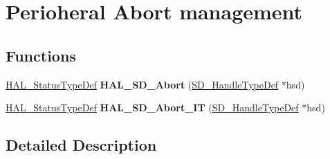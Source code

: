 \hypertarget{group___s_d___exported___functions___group6}{}\section{Perioheral Abort management}
\label{group___s_d___exported___functions___group6}
\subsection*{Functions}
\begin{DoxyCompactItemize}
\item 
\mbox{\label{group___s_d___exported___functions___group6_ga808a1b915df87614d0a4f2c2535791ac}} 
\mbox{\hyperlink{stm32f7xx__hal__def_8h_a63c0679d1cb8b8c684fbb0632743478f}{H\+A\+L\+\_\+\+Status\+Type\+Def}} {\bfseries H\+A\+L\+\_\+\+S\+D\+\_\+\+Abort} (\mbox{\hyperlink{group___s_d___exported___types___group3_ga1f31eb64a86b0c740bb5c02fa4c9914d}{S\+D\+\_\+\+Handle\+Type\+Def}} $\ast$hsd)
\item 
\mbox{\label{group___s_d___exported___functions___group6_ga92fba456be358bb2732075b05d46eead}} 
\mbox{\hyperlink{stm32f7xx__hal__def_8h_a63c0679d1cb8b8c684fbb0632743478f}{H\+A\+L\+\_\+\+Status\+Type\+Def}} {\bfseries H\+A\+L\+\_\+\+S\+D\+\_\+\+Abort\+\_\+\+IT} (\mbox{\hyperlink{group___s_d___exported___types___group3_ga1f31eb64a86b0c740bb5c02fa4c9914d}{S\+D\+\_\+\+Handle\+Type\+Def}} $\ast$hsd)
\end{DoxyCompactItemize}


\subsection{Detailed Description}
